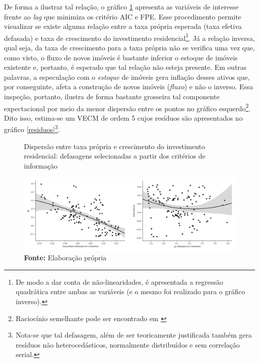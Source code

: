 De forma a ilustrar tal relação, o gráfico \ref{defasagens} apresenta as variáveis de interesse frente ao \textit{lag} que minimiza os critério AIC e FPE. Esse procedimento permite visualizar se existe alguma relação entre a taxa própria esperada (taxa efetiva defasada) e taxa de crescimento do investimento residencial\footnote{De modo a dar conta de não-linearidades, é apresentada a regressão quadrática entre ambas as variáveis (e o mesmo foi realizado para o gráfico inverso).}. Já a relação inversa, qual seja, da taxa de crescimento para a taxa própria não se verifica uma vez que, como visto, o fluxo de novos imóveis é bastante inferior o estoque de imóveis existente e, portanto, é esperado que tal relação não esteja presente. Em outras palavras, a especulação com o \textit{estoque}  de imóveis gera inflação desses ativos que, por conseguinte, afeta a construção de novos imóveis (\textit{fluxo}) e não o inverso. Essa inspeção, portanto, ilustra de forma bastante grosseira tal componente expectacional por meio da menor dispersão entre os pontos no gráfico esquerdo\footnote{Raciocínio semelhante pode ser encontrado em \textcite{girardi_autonomous_2015}}.  Dito isso,  estima-se um VECM de ordem 5 cujos resíduos são apresentados no gráfico \ref{residuos}\footnote{Nota-se que tal defasagem, além de ser teoricamente justificada também gera resíduos não heterocedásticos, normalmente distribuídos e sem correlação serial.}.

\begin{figure}[H]
	\centering
	\caption{Dispersão entre taxa própria e crescimento do investimento residencial: defasagens selecionadas a partir dos critérios de informação}
	\label{defasagens}
	\includegraphics[width=\textwidth]{Fatos_Estilizados/Figs/Scatter_VECM.png}
	\caption*{\textbf{Fonte:} Elaboração própria}
\end{figure}


